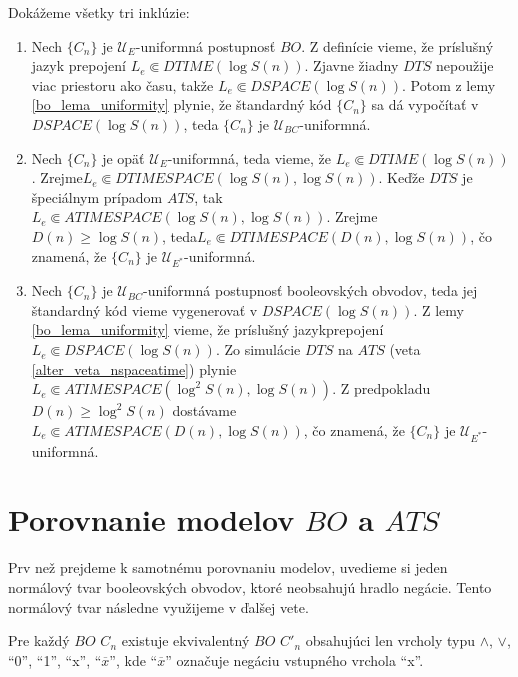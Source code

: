 {\begin{dokaz}
Dokážeme všetky tri inklúzie:
\begin{enumerate}
  \item Nech $\{ C_n\}$ je $\mathcal{U}_E$-uniformná postupnosť
  $BO$. Z definície vieme, že príslušný jazyk prepojení $L_e\Subset
  DTIME(\log S(n))$. Zjavne žiadny $DTS$ nepoužije viac priestoru
  ako času, takže $L_e\Subset DSPACE(\log S(n))$. Potom z lemy
  \ref{bo_lema_uniformity} plynie, že štandardný kód $\{ C_n\}$ sa dá
  vypočítať v $DSPACE(\log S(n))$, teda $\{ C_n\}$ je
  $\mathcal{U}_{BC}$-uniformná.
  \item Nech $\{ C_n\}$ je opäť $\mathcal{U}_E$-uniformná, teda
  vieme, že $L_e\Subset DTIME(\log S(n))$. Zrejme\linebreak $L_e\Subset
  DTIMESPACE(\log S(n),\log S(n))$. Keďže $DTS$ je špeciálnym
  prípadom $ATS$, tak $L_e\Subset ATIMESPACE(\log S(n),\log
  S(n))$. Zrejme $D(n)\geq\log S(n)$, teda\newline $L_e\Subset
  DTIMESPACE(D(n),\log S(n))$, čo znamená, že $\{ C_n\}$ je
  $\mathcal{U}_{E^*}$-uniformná.
  \item Nech $\{ C_n\}$ je $\mathcal{U}_{BC}$-uniformná postupnosť booleovských obvodov,
  teda jej štandardný kód vieme vygenerovať v $DSPACE(\log S(n))$. Z
  lemy \ref{bo_lema_uniformity} vieme, že príslušný jazyk\linebreak prepojení $L_e\Subset
  DSPACE(\log S(n))$. Zo simulácie $DTS$ na $ATS$ (veta
  \ref{alter_veta_nspaceatime}) plynie\linebreak $L_e\Subset ATIMESPACE(\log^2 S(n),\log
  S(n))$. Z predpokladu $D(n)\geq\log^2 S(n)$ dostávame $L_e\Subset
  ATIMESPACE(D(n),\log S(n))$, čo znamená, že $\{ C_n\}$ je
  $\mathcal{U}_{E^*}$-uniformná.
\end{enumerate}
\end{dokaz}

\section{Porovnanie modelov $BO$ a $ATS$}

Prv než prejdeme k samotnému porovnaniu modelov, uvedieme si jeden
normálový tvar booleov\-ských obvodov, ktoré neobsahujú hradlo
negácie. Tento normálový tvar následne využijeme v ďalšej vete.

\begin{lema}
Pre každý $BO$ $C_n$ existuje ekvivalentný $BO$ $C'_n$ obsahujúci
len vrcholy typu $\wedge$, $\vee$, ``0'', ``1'', ``x'',
``$\overline{x}$'', kde ``$\overline{x}$'' označuje negáciu
vstupného vrchola ``x''.
\end{lema}

}
